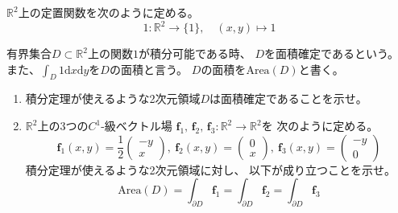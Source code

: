 \documentclass[12pt,b5paper]{ltjsarticle}
\begin{document}
\hrulefill

$\mathbb{R}^2$上の定置関数を次のように定める。
\begin{equation}
 1 : \mathbb{R}^2 \to \{1\} , \quad (x,y) \mapsto 1
\end{equation}

有界集合$D\subset\mathbb{R}^2$上の関数$1$が積分可能である時、
$D$を面積確定であるという。
また、$\int_D1\mathrm{d}x\mathrm{d}y$を$D$の面積と言う。
$D$の面積を$\mathrm{Area}(D)$と書く。

\begin{enumerate}
 \item
      積分定理が使えるような2次元領域$D$は面積確定であることを示せ。
 \item
      $\mathbb{R}^2$上の3つの$C^1$-級ベクトル場
      $\bm{f}_1,\,\bm{f}_2,\,\bm{f}_3:\mathbb{R}^2\to\mathbb{R}^2$を
      次のように定める。
      \begin{equation}
       \bm{f}_1(x,y)=\frac{1}{2}\begin{pmatrix}-y\\x\end{pmatrix}
       , \
       \bm{f}_2(x,y)=\begin{pmatrix}0\\x\end{pmatrix}
       , \
       \bm{f}_3(x,y)=\begin{pmatrix}-y\\0\end{pmatrix}
      \end{equation}
      積分定理が使えるような2次元領域に対し、
      以下が成り立つことを示せ。
      \begin{equation}
       \mathrm{Area}(D)
        = \int_{\partial D}\bm{f}_1
        = \int_{\partial D}\bm{f}_2
        = \int_{\partial D}\bm{f}_3
      \end{equation}
\end{enumerate}

\dotfill
\end{document}
